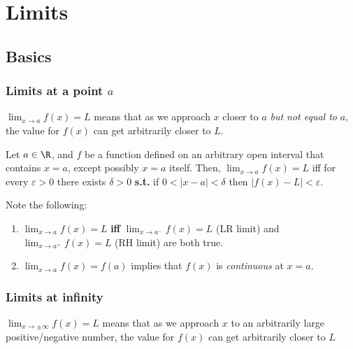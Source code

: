 \documentclass[main.tex]{subfiles}
\begin{document}
\section{Limits}
\begin{multicols}{2} \raggedcolumns \setcounter{unbalance}{10}
	\subsection*{Basics}
	\subsubsection*{Limits at a point \(a\)}
	\begin{definition}[informal]
		\(\lim_{x \to a}{f(x)} = L\) means that as we approach \(x\) closer to \(a\) \emph{but not equal to} \(a\), 
		the value for \(f(x)\) can get arbitrarily closer to \(L\).
	\end{definition} 


	\begin{definition}[formal]
		Let \(a \in \R\), and \(f\) be a function defined on an arbitrary open interval that contains \(x = a\), except possibly \(x = a\) itself.
		Then, \(\lim_{x \to a}{f(x)} = L\) iff for every \(\varepsilon > 0\) there exists \(\delta > 0\) \textbf{s.t.} if \(0 < |x - a| < \delta\) then \( |f(x) - L| < \varepsilon\).
	\end{definition}

	Note the following:
	\begin{enumerate}
	\item \(\lim_{x \to a}{f(x)} = L\) \textbf{iff} \(\lim_{x \to a^{-}}{f(x)} = L\) (LR limit) 
	and \(\lim_{x \to a^{+}}{f(x)} = L\) (RH limit) are both true.
	\item \(\lim_{x \to a}{f(x)} = f(a)\) implies that \(f(x)\) is \emph{continuous} at \(x = a\).
	\end{enumerate}

	\subsubsection*{Limits at infinity}
	\begin{definition}[informal]
		\(\lim_{x \to \pm \infty}{f(x)} = L\) means that as we approach \(x\) to an arbitrarily large positive/negative number, the value for \(f(x)\) can get arbitrarily closer to \(L\)
	\end{definition}


\end{multicols}
\end{document}
